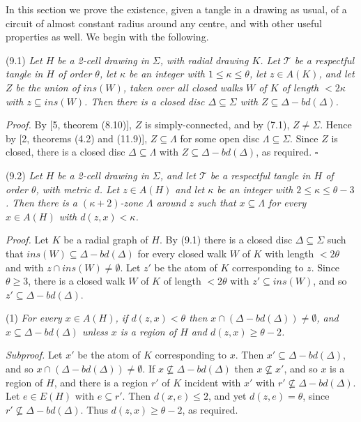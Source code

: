 
In this section we prove the existence, given a tangle in a drawing as usual, of a circuit of almost constant radius around any centre, and with other useful properties as well. We begin with the following.

\stmt
(9.1) \textit{Let $H$ be a 2-cell drawing in $\Sigma$, with radial drawing $K$. Let $\mathscr{T}$ be a respectful tangle in $H$ of order $\theta$, let $\kappa$ be an integer with $1 \le \kappa \le \theta$, let $z \in A(K)$, and let $Z$ be the union of $ins(W)$, taken over all closed walks $W$ of $K$ of length $< 2\kappa$ with $z \subseteq ins(W)$. Then there is a closed disc $\Delta \subseteq \Sigma$ with $Z \subseteq \Delta - bd(\Delta)$.}

\textit{Proof.} By [5, theorem (8.10)], $Z$ is simply-connected, and by (7.1), $Z \ne \Sigma$. Hence by [2, theorems (4.2) and (11.9)], $Z \subseteq \Lambda$ for some open disc $\Lambda \subseteq \Sigma$. Since $Z$ is closed, there is a closed disc $\Delta \subseteq \Lambda$ with $Z \subseteq \Delta - bd(\Delta)$, as required. $\square$

\stmt
(9.2) \textit{Let $H$ be a 2-cell drawing in $\Sigma$, and let $\mathscr{T}$ be a respectful tangle in $H$ of order $\theta$, with metric $d$. Let $z \in A(H)$ and let $\kappa$ be an integer with $2 \le \kappa \le \theta - 3$. Then there is a $(\kappa + 2)$-zone $\Lambda$ around $z$ such that $x \subseteq \Lambda$ for every $x \in A(H)$ with $d(z, x) < \kappa$.}

\textit{Proof.} Let $K$ be a radial graph of $H$. By (9.1) there is a closed disc $\Delta \subseteq \Sigma$ such that $ins(W) \subseteq \Delta - bd(\Delta)$ for every closed walk $W$ of $K$ with length $< 2\theta$ and with $z \cap ins(W) \ne \emptyset$. Let $z'$ be the atom of $K$ corresponding to $z$. Since $\theta \ge 3$, there is a closed walk $W$ of $K$ of length $< 2\theta$ with $z' \subseteq ins(W)$, and so $z' \subseteq \Delta - bd(\Delta)$.

\hspace*{12pt}(1) \textit{For every $x \in A(H)$, if $d(z, x) < \theta$ then $x \cap (\Delta - bd(\Delta)) \ne \emptyset$, and $x \subseteq \Delta - bd(\Delta)$ unless $x$ is a region of $H$ and $d(z, x) \ge \theta - 2$.}

\textit{Subproof.} Let $x'$ be the atom of $K$ corresponding to $x$. Then $x' \subseteq \Delta - bd(\Delta)$, and so $x \cap (\Delta - bd(\Delta)) \ne \emptyset$. If $x \not\subseteq \Delta - bd(\Delta)$ then $x \not\subseteq x'$, and so $x$ is a region of $H$, and there is a region $r'$ of $K$ incident with $x'$ with $r' \not\subseteq \Delta - bd(\Delta)$. Let $e \in E(H)$ with $e \subseteq r'$. Then $d(x, e) \le 2$, and yet $d(z, e) = \theta$, since $r' \not\subseteq \Delta - bd(\Delta)$. Thus $d(z, x) \ge \theta - 2$, as required.

